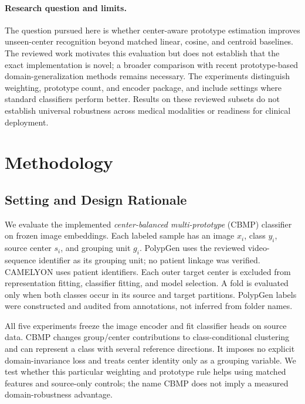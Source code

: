 \paragraph{Research question and limits.}
The question pursued here is whether center-aware prototype estimation improves unseen-center recognition beyond matched linear, cosine, and centroid baselines. The reviewed work motivates this evaluation but does not establish that the exact implementation is novel; a broader comparison with recent prototype-based domain-generalization methods remains necessary. The experiments distinguish weighting, prototype count, and encoder package, and include settings where standard classifiers perform better. Results on these reviewed subsets do not establish universal robustness across medical modalities or readiness for clinical deployment.

\section{Methodology}
\label{sec:method}

\subsection{Setting and Design Rationale}
We evaluate the implemented \emph{center-balanced multi-prototype} (CBMP) classifier on frozen image embeddings. Each labeled sample has an image $x_i$, class $y_i$, source center $s_i$, and grouping unit $g_i$. PolypGen uses the reviewed video-sequence identifier as its grouping unit; no patient linkage was verified. CAMELYON uses patient identifiers. Each outer target center is excluded from representation fitting, classifier fitting, and model selection. A fold is evaluated only when both classes occur in its source and target partitions. PolypGen labels were constructed and audited from annotations, not inferred from folder names.

All five experiments freeze the image encoder and fit classifier heads on source data. CBMP changes group/center contributions to class-conditional clustering and can represent a class with several reference directions. It imposes no explicit domain-invariance loss and treats center identity only as a grouping variable. We test whether this particular weighting and prototype rule helps using matched features and source-only controls; the name CBMP does not imply a measured domain-robustness advantage.

